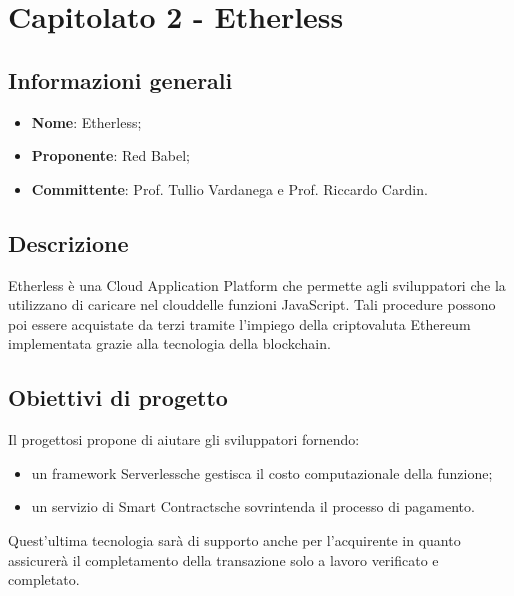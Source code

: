 \section{Capitolato 2 - Etherless}
\subsection{Informazioni generali}
    \begin{itemize}
        \item \textbf{Nome}: Etherless;
        \item \textbf{Proponente}: Red Babel;
        \item \textbf{Committente}: Prof. Tullio Vardanega e Prof. Riccardo Cardin.
    \end{itemize}
\subsection{Descrizione}
    Etherless è una Cloud Application Platform che permette agli sviluppatori che la utilizzano di caricare nel cloud\glosp delle funzioni
    JavaScript. Tali procedure possono poi essere acquistate da terzi tramite l'impiego della criptovaluta Ethereum implementata
    grazie alla tecnologia della blockchain.
\subsection{Obiettivi di progetto}
    Il progetto\glosp si propone di aiutare gli sviluppatori fornendo:
    \begin{itemize}
        \item un framework Serverless\glosp che gestisca il costo computazionale della funzione;
        \item un servizio di Smart Contracts\glosp che sovrintenda il processo di pagamento.
    \end{itemize}
    Quest'ultima tecnologia sarà di supporto anche per l'acquirente in quanto assicurerà il completamento della transazione solo a lavoro verificato e completato.
